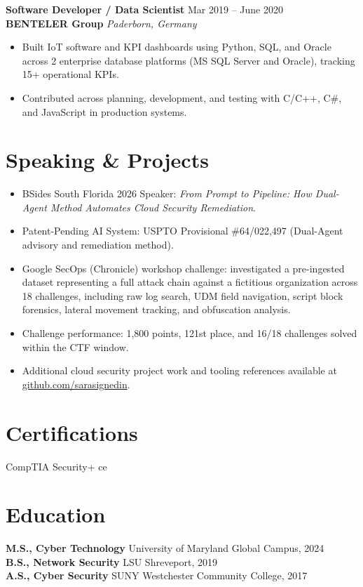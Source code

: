 \documentclass[10pt,letterpaper]{article}
\newcommand{\ri}[1]{\item #1}
\newcommand{\rs}[4]{
  {\color{accent}\bfseries\fontsize{11pt}{12.5pt}\selectfont #1} \hfill #2 \\
  {\color{accent}\textbf{#3}} \hfill \textit{#4} \\
  \vspace{-3pt}
}
\begin{document}
\rs{Software Developer / Data Scientist}{Mar 2019 -- June 2020}{BENTELER Group}{Paderborn, Germany}
\begin{itemize}
  \ri{Built IoT software and KPI dashboards using Python, SQL, and Oracle across 2 enterprise database platforms (MS SQL Server and Oracle), tracking 15+ operational KPIs.}
  \ri{Contributed across planning, development, and testing with C/C++, C\#, and JavaScript in production systems.}
\end{itemize}

\section*{Speaking \& Projects}
\begin{itemize}
  \ri{BSides South Florida 2026 Speaker: \textit{From Prompt to Pipeline: How Dual-Agent Method Automates Cloud Security Remediation}.}
  \ri{Patent-Pending AI System: USPTO Provisional \#64/022,497 (Dual-Agent advisory and remediation method).}
  \ri{Google SecOps (Chronicle) workshop challenge: investigated a pre-ingested dataset representing a full attack chain against a fictitious organization across 18 challenges, including raw log search, UDM field navigation, script block forensics, lateral movement tracking, and obfuscation analysis.}
  \ri{Challenge performance: 1,800 points, 121st place, and 16/18 challenges solved within the CTF window.}
  \ri{Additional cloud security project work and tooling references available at \href{https://github.com/sarasignedin}{github.com/sarasignedin}.}
\end{itemize}

\section*{Certifications}
CompTIA Security+ ce

\section*{Education}
\textbf{M.S., Cyber Technology} \hfill University of Maryland Global Campus, 2024 \\
\textbf{B.S., Network Security} \hfill LSU Shreveport, 2019 \\
\textbf{A.S., Cyber Security} \hfill SUNY Westchester Community College, 2017
\end{document}
